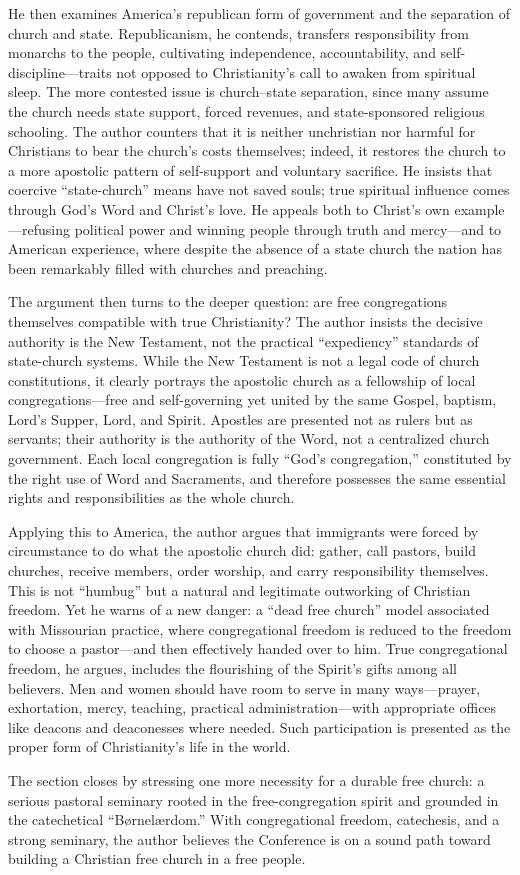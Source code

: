He then examines America’s republican form of government and the separation of church and state. Republicanism, he contends, transfers responsibility from monarchs to the people, cultivating independence, accountability, and self-discipline—traits not opposed to Christianity’s call to awaken from spiritual sleep. The more contested issue is church–state separation, since many assume the church needs state support, forced revenues, and state-sponsored religious schooling. The author counters that it is neither unchristian nor harmful for Christians to bear the church’s costs themselves; indeed, it restores the church to a more apostolic pattern of self-support and voluntary sacrifice. He insists that coercive “state-church” means have not saved souls; true spiritual influence comes through God’s Word and Christ’s love. He appeals both to Christ’s own example—refusing political power and winning people through truth and mercy—and to American experience, where despite the absence of a state church the nation has been remarkably filled with churches and preaching.

The argument then turns to the deeper question: are free congregations themselves compatible with true Christianity? The author insists the decisive authority is the New Testament, not the practical “expediency” standards of state-church systems. While the New Testament is not a legal code of church constitutions, it clearly portrays the apostolic church as a fellowship of local congregations—free and self-governing yet united by the same Gospel, baptism, Lord’s Supper, Lord, and Spirit. Apostles are presented not as rulers but as servants; their authority is the authority of the Word, not a centralized church government. Each local congregation is fully “God’s congregation,” constituted by the right use of Word and Sacraments, and therefore possesses the same essential rights and responsibilities as the whole church.

Applying this to America, the author argues that immigrants were forced by circumstance to do what the apostolic church did: gather, call pastors, build churches, receive members, order worship, and carry responsibility themselves. This is not “humbug” but a natural and legitimate outworking of Christian freedom. Yet he warns of a new danger: a “dead free church” model associated with Missourian practice, where congregational freedom is reduced to the freedom to choose a pastor—and then effectively handed over to him. True congregational freedom, he argues, includes the flourishing of the Spirit’s gifts among all believers. Men and women should have room to serve in many ways—prayer, exhortation, mercy, teaching, practical administration—with appropriate offices like deacons and deaconesses where needed. Such participation is presented as the proper form of Christianity’s life in the world.

The section closes by stressing one more necessity for a durable free church: a serious pastoral seminary rooted in the free-congregation spirit and grounded in the catechetical “Børnelærdom.” With congregational freedom, catechesis, and a strong seminary, the author believes the Conference is on a sound path toward building a Christian free church in a free people.